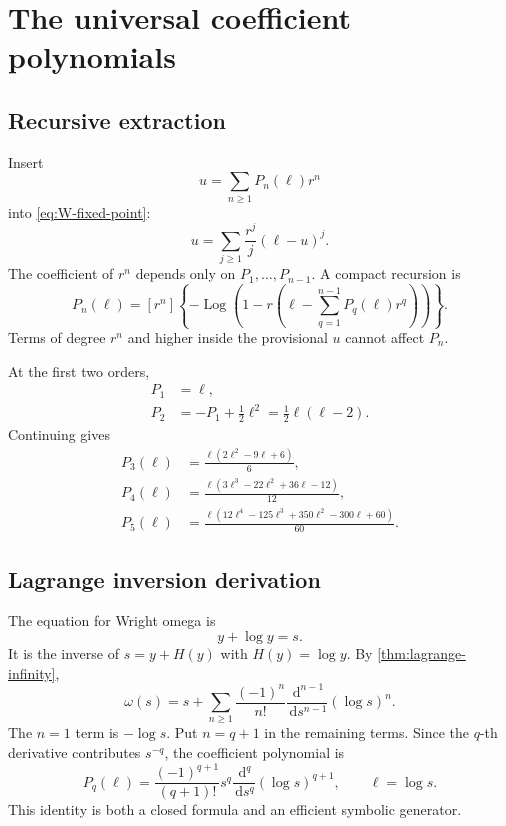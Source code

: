 \documentclass[11pt,openany]{book}
\theoremstyle{definition}
\theoremstyle{plain}
\theoremstyle{remark}
\newcommand{\dd}{\,\mathrm{d}}
\DeclareMathOperator{\Log}{Log}
\begin{document}
\chapter{The universal coefficient polynomials}\label{ch:W-coefficients}

\section{Recursive extraction}
Insert
\[
 u=\sum_{n\ge1}P_n(\ell)r^n
\]
into \cref{eq:W-fixed-point}:
\begin{equation}\label{eq:W-recursive-master}
 u=\sum_{j\ge1}\frac{r^j}{j}(\ell-u)^j.
\end{equation}
The coefficient of \(r^n\) depends only on \(P_1,\ldots,P_{n-1}\). A compact recursion is
\begin{equation}\label{eq:Pn-coefficient-recursion}
 P_n(\ell)=
 [r^n]\left\{-\Log\left(1-r\left(\ell-
 \sum_{q=1}^{n-1}P_q(\ell)r^q\right)\right)\right\}.
\end{equation}
Terms of degree \(r^n\) and higher inside the provisional \(u\) cannot affect \(P_n\).

At the first two orders,
\begin{align*}
 P_1&=\ell,\\
 P_2&=-P_1+\frac12\ell^2
 =\frac12\ell(\ell-2).
\end{align*}
Continuing gives
\begin{align}
 P_3(\ell)&=\frac{\ell(2\ell^2-9\ell+6)}6,\label{eq:P3}\\
 P_4(\ell)&=\frac{\ell(3\ell^3-22\ell^2+36\ell-12)}{12},\label{eq:P4}\\
 P_5(\ell)&=\frac{\ell(12\ell^4-125\ell^3+350\ell^2-300\ell+60)}{60}.
\label{eq:P5}
\end{align}

\section{Lagrange inversion derivation}
The equation for Wright omega is
\[
 y+\log y=s.
\]
It is the inverse of \(s=y+H(y)\) with \(H(y)=\log y\). By \cref{thm:lagrange-infinity},
\begin{equation}\label{eq:omega-lagrange-again}
 \omega(s)=s+\sum_{n\ge1}\frac{(-1)^n}{n!}
 \frac{\dd^{n-1}}{\dd s^{n-1}}(\log s)^n.
\end{equation}
The \(n=1\) term is \(-\log s\). Put \(n=q+1\) in the remaining terms. Since the \(q\)-th derivative contributes \(s^{-q}\), the coefficient polynomial is
\begin{equation}\label{eq:Pn-derivative}
 P_q(\ell)=
 \frac{(-1)^{q+1}}{(q+1)!}
 s^q\frac{\dd^q}{\dd s^q}(\log s)^{q+1},
 \qquad \ell=\log s.
\end{equation}
This identity is both a closed formula and an efficient symbolic generator.
\end{document}
